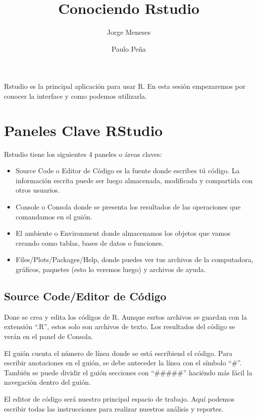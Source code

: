 \documentclass[]{tufte-handout}
\title{Conociendo Rstudio}
\author{Jorge Meneses \and Paulo Peña}
\date{}
\providecommand{\tightlist}{%
  \setlength{\itemsep}{0pt}\setlength{\parskip}{0pt}}
\begin{document}
\maketitle




Rstudio es la principal aplicación para usar R. En esta sesión
empezaremos por conocer la interface y como podemos utilizarla.

\hypertarget{paneles-clave-rstudio}{%
\section{Paneles Clave RStudio}\label{paneles-clave-rstudio}}

Rstudio tiene los siguientes 4 paneles o áreas claves:

\begin{itemize}
\tightlist
\item
  Source Code o Editor de Código es la fuente donde escribes tú código.
  La información escrita puede ser luego almacenada, modificada y
  compartida con otros usuarios.
\item
  Console o Consola donde se presenta los resultados de las operaciones
  que comandamos en el guión.
\item
  El ambiente o Environment donde almacenamos los objetos que vamos
  creando como tablas, bases de datos o funciones.
\item
  Files/Plots/Packages/Help, donde puedes ver tus archivos de la
  computadora, gráficos, paquetes (esto lo veremos luego) y archivos de
  ayuda.
\end{itemize}

\hypertarget{source-codeeditor-de-cuxf3digo}{%
\subsection{Source Code/Editor de
Código}\label{source-codeeditor-de-cuxf3digo}}

Done se crea y edita los códigos de R. Aunque esrtos archivos se guardan
con la extensión ``.R'', estos solo son archivos de texto. Los
resultados del código se verán en el panel de Consola.

El guión cuenta el número de línea donde se está escribiend el código.
Para escribir anotaciones en el guión, se debe anteceder la línea con el
símbolo ``\#''. También se puede dividir el guión secciones con
``\#\#\#\#\#'' haciéndo más fácil la navegación dentro del guión.

El editor de código será nuestro principal espacio de trabajo. Aquí
podemos escribir todas las instrucciones para realizar nuestros análisis
y reportes.
\end{document}
